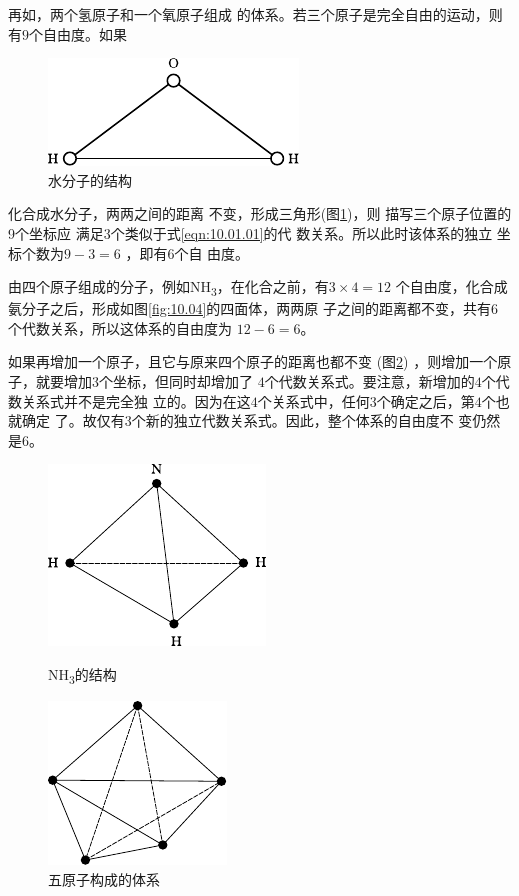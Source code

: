 再如，两个氢原子和一个氧原子组成
的体系。若三个原子是完全自由的运动，则有$ 9 $个自由度。如果

\begin{figure}
  \centering
  \includegraphics{figure/fig10.03}
  \caption{水分子的结构}
  \label{fig:10.03}
\end{figure}
\noindent
化合成水分子，两两之间的距离
不变，形成三角形(图\ref{fig:10.03})，则
描写三个原子位置的9个坐标应
满足$ 3 $个类似于式\eqref{eqn:10.01.01}的代
数关系。所以此时该体系的独立
坐标个数为$ 9 - 3 = 6 $ ，即有$ 6 $个自
由度。

由四个原子组成的分子，例如NH\textsubscript{3}，在化合之前，有$ 3 \times 4 = 1 2 $
个自由度，化合成氨分子之后，形成如图\ref{fig:10.04}的四面体，两两原
子之间的距离都不变，共有$ 6 $个代数关系，所以这体系的自由度为
$ 1 2 - 6 = 6 $。

如果再增加一个原子，且它与原来四个原子的距离也都不变
(图\ref{fig:10.05}) ，则增加一个原子，就要增加$ 3 $个坐标，但同时却增加了
$ 4 $个代数关系式。要注意，新增加的$ 4 $个代数关系式并不是完全独
立的。因为在这$ 4 $个关系式中，任何$ 3 $个确定之后，第$ 4 $个也就确定
了。故仅有$ 3 $个新的独立代数关系式。因此，整个体系的自由度不
变仍然是$ 6 $。

\clearpage
\begin{figure}[h]
  \begin{minipage}[b]{0.5\linewidth}
    \centering
    \includegraphics{figure/fig10.04}
    \caption{NH\textsubscript{3}的结构}
    \label{fig:10.04}
  \end{minipage}
  \begin{minipage}[b]{0.5\linewidth}
    \centering
    \includegraphics{figure/fig10.05}
    \caption{五原子构成的体系}
    \label{fig:10.05}
  \end{minipage}
\end{figure}

